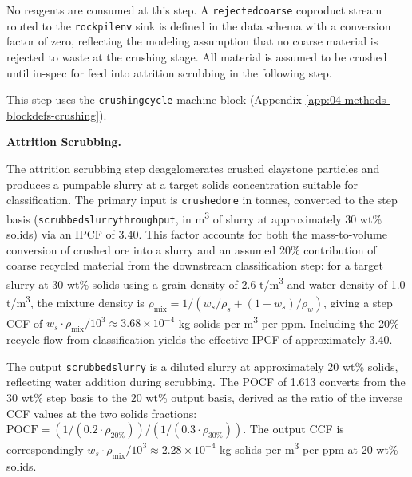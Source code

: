 \documentclass{article}
\renewcommand\_{\textunderscore\allowbreak}
\begin{document}
No reagents are consumed at this step. A \texttt{rejected\_coarse} coproduct stream routed to the \texttt{rock\_pile\_nv\_100} sink is defined in the data schema with a conversion factor of zero, reflecting the modeling assumption that no coarse material is rejected to waste at the crushing stage. All material is assumed to be crushed until in-spec for feed into attrition scrubbing in the following step. 

This step uses the \texttt{crushing\_cycle} machine block (Appendix \ref{app:04-methods-blockdefs-crushing}).

\medskip
\noindent\textbf{Attrition Scrubbing.}\quad

The attrition scrubbing step deagglomerates crushed claystone particles and produces a pumpable slurry at a target solids concentration suitable for classification. The primary input is \texttt{crushed\_ore} in tonnes, converted to the step basis (\texttt{scrubbed\_slurry\_throughput}, in \si{m^3} of slurry at approximately 30 wt\% solids) via an IPCF of 3.40. This factor accounts for both the mass-to-volume conversion of crushed ore into a slurry and an assumed 20\% contribution of coarse recycled material from the downstream classification step: for a target slurry at 30 wt\% solids using a grain density of 2.6 \si{t/m^3} and water density of 1.0 \si{t/m^3}, the mixture density is $\rho_{\text{mix}} = 1/(w_s/\rho_s + (1-w_s)/\rho_w)$, giving a step CCF of $w_s \cdot \rho_{\text{mix}} / 10^3 \approx 3.68 \times 10^{-4}$ kg solids per \si{m^3} per ppm. Including the 20\% recycle flow from classification yields the effective IPCF of approximately 3.40.

The output \texttt{scrubbed\_slurry} is a diluted slurry at approximately 20 wt\% solids, reflecting water addition during scrubbing. The POCF of 1.613 converts from the 30 wt\% step basis to the 20 wt\% output basis, derived as the ratio of the inverse CCF values at the two solids fractions: $\text{POCF} = (1/(0.2 \cdot \rho_{20\%})) / (1/(0.3 \cdot \rho_{30\%}))$. The output CCF is correspondingly $w_s \cdot \rho_{\text{mix}} / 10^3 \approx 2.28 \times 10^{-4}$ kg solids per \si{m^3} per ppm at 20 wt\% solids.
\end{document}
